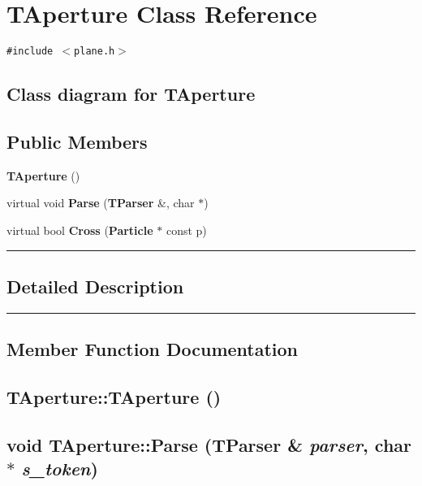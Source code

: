 \section{TAperture  Class Reference}
\label{TAperture}


{\tt \#include $<$plane.h$>$}

\subsection*{Class diagram for TAperture}
\begin{figure}[H]
\begin{center}
\leavevmode
\setlength{\epsfysize}{2cm}
\end{center}
\end{figure}
\subsection*{Public Members}
\begin{CompactItemize}
\item 
{\bf TAperture} ()
\item 
virtual void {\bf Parse} ({\bf TParser} \&, char $\ast$)
\item 
virtual bool {\bf Cross} ({\bf Particle} $\ast$ const p)
\end{CompactItemize}
\vspace{0.4cm}\hrule\vspace{0.2cm}
\subsection*{Detailed Description}
\vspace{0.4cm}\hrule\vspace{0.2cm}
\subsection*{Member Function Documentation}
\label{TAperture_a0}
\subsection{\setlength{\rightskip}{0pt plus 5cm}TAperture::TAperture ()}

\label{TAperture_a1}
\subsection{\setlength{\rightskip}{0pt plus 5cm}void TAperture::Parse ({\bf TParser} \& {\em parser}, char $\ast$ {\em s\_\-token})\hspace{0.3cm}{\tt  [virtual]}}



